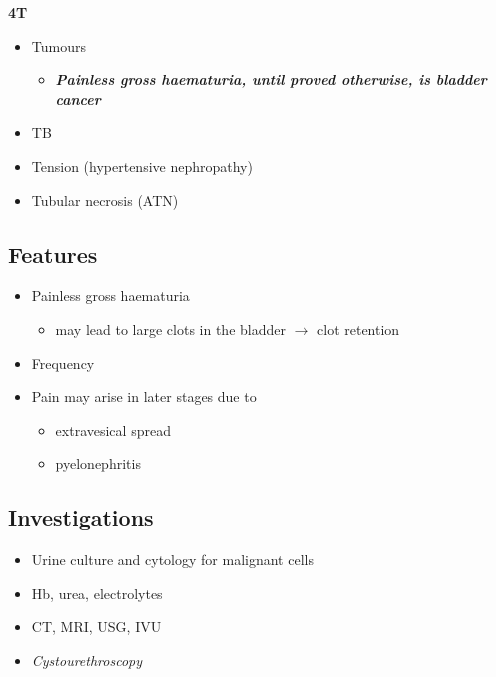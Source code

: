 \documentclass[
  14pt,
]{memoir}
\providecommand{\tightlist}{%
  \setlength{\itemsep}{0pt}\setlength{\parskip}{0pt}}
\begin{document}
\textbf{4T}

\begin{itemize}
\tightlist
\item
  Tumours

  \begin{itemize}
  \tightlist
  \item
    \emph{\textbf{Painless gross haematuria, until proved otherwise, is
    bladder cancer}}
  \end{itemize}
\item
  TB
\item
  Tension (hypertensive nephropathy)
\item
  Tubular necrosis (ATN)
\end{itemize}

\hypertarget{features-7}{%
\subsection{Features}\label{features-7}}

\begin{itemize}
\tightlist
\item
  Painless gross haematuria

  \begin{itemize}
  \tightlist
  \item
    may lead to large clots in the bladder \(\rightarrow\) clot
    retention
  \end{itemize}
\item
  Frequency
\item
  Pain may arise in later stages due to

  \begin{itemize}
  \tightlist
  \item
    extravesical spread
  \item
    pyelonephritis
  \end{itemize}
\end{itemize}

\hypertarget{investigations-6}{%
\subsection{Investigations}\label{investigations-6}}

\begin{itemize}
\tightlist
\item
  Urine culture and cytology for malignant cells
\item
  Hb, urea, electrolytes
\item
  CT, MRI, USG, IVU
\item
  \emph{Cystourethroscopy}
\end{itemize}
\end{document}
